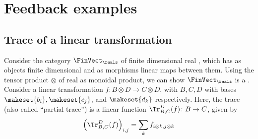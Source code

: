 
\section{Feedback examples}
\publictodomessage

\subsection{Trace of a linear transformation}
\label{subsec:trace-linear}
Consider the category $\FinVect_\reals$ of finite dimensional real , which has as objects finite dimensional  and as morphisms linear maps between them.
Using the tensor product $\otimes$ of real  as monoidal product, we can show $\FinVect_\reals$ is a .
Consider a linear transformation $f\colon B\otimes D\to C\otimes D$, with $B,C,D$  with bases $\makeset{b_i},\makeset{c_j}$, and $\makeset{d_k}$ respectively.
Here, the trace (also called ``partial trace'') is a linear function $\Tr_{B,C}
    ^D(f)\colon B\to C$, given by
\begin{equation}
    \left(\Tr_{B,C}
    ^D(f) \right)_{i,j}=\sum_{k}f_{i\otimes k,j\otimes k}
\end{equation}

